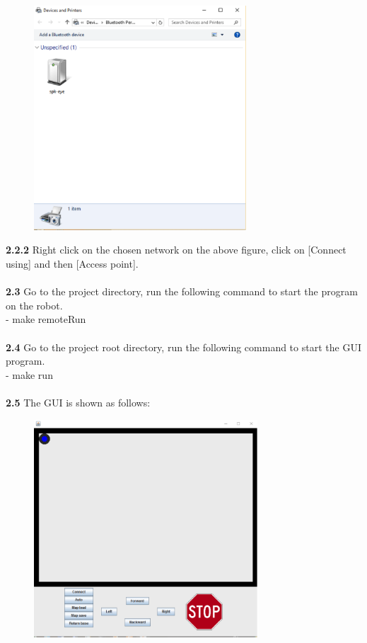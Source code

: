 \documentclass[11pt, a4paper]{article}
\begin{document}
\begin{figure}[H]
\centering
\includegraphics[height=3.3in]{UM1}
\end{figure}

\indent\textbf{2.2.2} Right click on the chosen network on the above figure, click on [Connect using] and then [Access point]. \\
\\
\indent\textbf{2.3} Go to the project directory, run the following command to start the program on the robot.\\
 \indent \indent- make remoteRun\\
 \\
\indent\textbf{2.4} Go to the project root directory, run the following command to start the GUI program.\\
\indent \indent - make run\\
 \\
\indent\textbf{2.5} The GUI is shown as follows:\\

\begin{figure}[H]
\centering
\includegraphics[height=3.2in]{UM2}
\end{figure}
\end{document}
